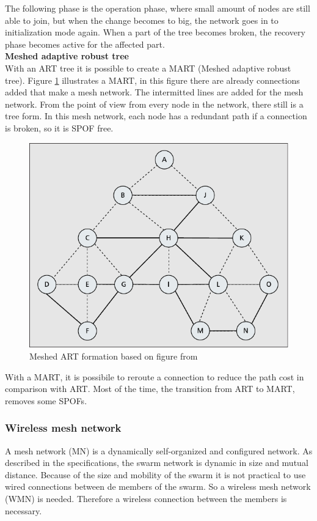 \documentclass[10pt,a4paper]{article}
\begin{document}
The following phase is the operation phase, where small amount of nodes are still able to join, but when the change becomes to big, the network goes in to initialization mode again. When a part of the tree becomes broken, the recovery phase becomes active for the affected part.\\

\textbf{Meshed adaptive robust tree}\\
With an ART tree it is possible to create a MART (Meshed adaptive robust tree). Figure \ref{fig:meshtree} illustrates a MART, in this figure there are already connections added that make a mesh network. The intermitted lines are added for the mesh network. From the point of view from every node in the network, there still is a tree form. In this mesh network, each node has a redundant path if a connection is broken, so it is SPOF free.

\begin{figure}[H]
   \centering
   \includegraphics[width=1\textwidth]{meshtree}
   \caption{Meshed ART formation based on figure from \cite{emergingstandarsforwirelessmeshtechnology}}
   \label{fig:meshtree}
\end{figure}

With a MART, it is possibile to reroute a connection to reduce the path cost in comparison with ART. Most of the time, the transition from ART to MART, removes some SPOFs.

\subsubsection{Wireless mesh network}
A mesh network (MN) is a dynamically self-organized and configured network. \cite{WMN1} As described in the specifications, the swarm network is dynamic in size and mutual distance. Because of the size and mobility of the swarm it is not practical to use wired connections between de members of the swarm. So a wireless mesh network (WMN) is needed. Therefore a wireless connection between the members is necessary.
\end{document}
